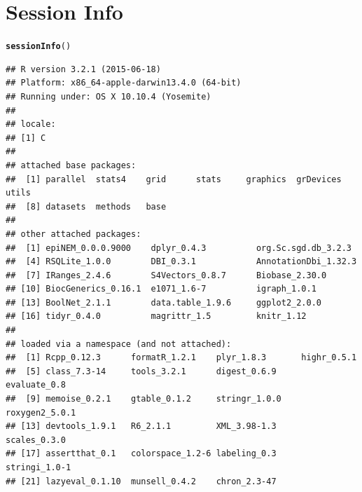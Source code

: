\documentclass[paper=a4,notitlepage,DIV=12]{scrartcl}\usepackage[]{graphicx}\usepackage[]{color}
\makeatletter
\newcommand{\hlstd}[1]{\textcolor[rgb]{0.345,0.345,0.345}{#1}}%
\newcommand{\hlkwd}[1]{\textcolor[rgb]{0.737,0.353,0.396}{\textbf{#1}}}%
\newenvironment{kframe}{%
 \def\at@end@of@kframe{}%
 \ifinner\ifhmode%
  \def\at@end@of@kframe{\end{minipage}}%
  \begin{minipage}{\columnwidth}%
 \fi\fi%
 \def\FrameCommand##1{\hskip\@totalleftmargin \hskip-\fboxsep
 \colorbox{shadecolor}{##1}\hskip-\fboxsep
     \hskip-\linewidth \hskip-\@totalleftmargin \hskip\columnwidth}%
 \MakeFramed {\advance\hsize-\width
   \@totalleftmargin\z@ \linewidth\hsize
   \@setminipage}}%
 {\par\unskip\endMakeFramed%
 \at@end@of@kframe}
\newenvironment{knitrout}{}{} %
\makeatother
\begin{document}
        
\clearpage
\section{Session Info}
\begin{knitrout}
\color{fgcolor}\begin{kframe}
\begin{alltt}
\hlkwd{sessionInfo}\hlstd{()}
\end{alltt}
\begin{verbatim}
## R version 3.2.1 (2015-06-18)
## Platform: x86_64-apple-darwin13.4.0 (64-bit)
## Running under: OS X 10.10.4 (Yosemite)
## 
## locale:
## [1] C
## 
## attached base packages:
##  [1] parallel  stats4    grid      stats     graphics  grDevices utils    
##  [8] datasets  methods   base     
## 
## other attached packages:
##  [1] epiNEM_0.0.0.9000    dplyr_0.4.3          org.Sc.sgd.db_3.2.3 
##  [4] RSQLite_1.0.0        DBI_0.3.1            AnnotationDbi_1.32.3
##  [7] IRanges_2.4.6        S4Vectors_0.8.7      Biobase_2.30.0      
## [10] BiocGenerics_0.16.1  e1071_1.6-7          igraph_1.0.1        
## [13] BoolNet_2.1.1        data.table_1.9.6     ggplot2_2.0.0       
## [16] tidyr_0.4.0          magrittr_1.5         knitr_1.12          
## 
## loaded via a namespace (and not attached):
##  [1] Rcpp_0.12.3      formatR_1.2.1    plyr_1.8.3       highr_0.5.1     
##  [5] class_7.3-14     tools_3.2.1      digest_0.6.9     evaluate_0.8    
##  [9] memoise_0.2.1    gtable_0.1.2     stringr_1.0.0    roxygen2_5.0.1  
## [13] devtools_1.9.1   R6_2.1.1         XML_3.98-1.3     scales_0.3.0    
## [17] assertthat_0.1   colorspace_1.2-6 labeling_0.3     stringi_1.0-1   
## [21] lazyeval_0.1.10  munsell_0.4.2    chron_2.3-47
\end{verbatim}
\end{kframe}
\end{knitrout}



\end{document}
